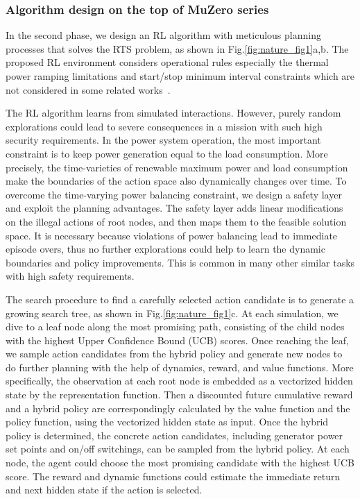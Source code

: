 \subsubsection*{Algorithm design on the top of MuZero series}
In the second phase, we design an RL algorithm with meticulous planning processes that solves the RTS problem,
as shown in Fig.\ref{fig:nature_fig1}a,b. The proposed RL environment considers operational rules especially the thermal power ramping limitations and start/stop minimum interval constraints which are not considered in some related works~\cite{zhou2021deep,yan2020real}.

The RL algorithm learns from simulated interactions. However, purely random explorations could lead to severe consequences in a mission with such high security requirements. In the power system operation, the most important constraint is to keep power generation equal to the load consumption. More precisely, the time-varieties of renewable maximum power and load consumption make the boundaries of the action space also dynamically changes over time. To overcome the time-varying power balancing constraint, we design a safety layer and exploit the planning advantages. The safety layer adds linear modifications on the illegal actions of root nodes, and then maps them to the feasible solution space. It is necessary because violations of power balancing lead to immediate episode overs, thus no further explorations could help to learn the dynamic boundaries and policy improvements. This is common in many other similar tasks with high safety requirements. 

The search procedure to find a carefully selected action candidate is to generate a growing search tree, as shown in Fig.\ref{fig:nature_fig1}c. At each simulation, we dive to a leaf node along the most promising path, consisting of the child nodes with the highest Upper Confidence Bound (UCB) scores. Once reaching the leaf, we sample action candidates from the hybrid policy and generate new nodes to do further planning with the help of dynamics, reward, and value functions. More specifically, the observation at each root node is embedded as a vectorized hidden state by the representation function. Then a discounted future cumulative reward and a hybrid policy are correspondingly calculated by the value function and the policy function, using the vectorized hidden state as input. Once the hybrid policy is determined, the concrete action candidates, including generator power set points and on/off switchings, can be sampled from the hybrid policy. At each node, the agent could choose the most promising candidate with the highest UCB score. The reward and dynamic functions could estimate the immediate return and next hidden state if the action is selected.

